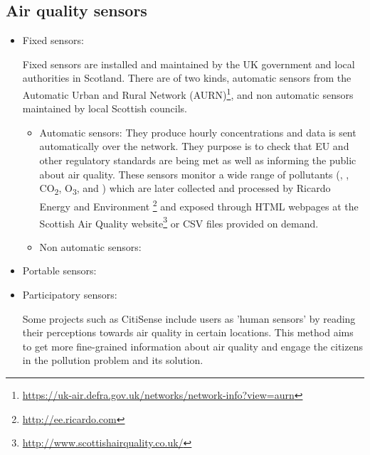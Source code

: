 \subsection{Air quality sensors}

\begin{itemize}

\item Fixed sensors: 

Fixed sensors are installed and maintained by the UK government and local authorities in Scotland. There are of two kinds, automatic sensors from the Automatic Urban and Rural Network (AURN)\footnote{\url{https://uk-air.defra.gov.uk/networks/network-info?view=aurn}}, and non automatic sensors maintained by local Scottish councils. 

	\begin{itemize}
    
    \item Automatic sensors: They produce hourly concentrations and data is sent automatically over the network. They purpose is to check that EU and other regulatory standards are being met as well as informing the public about air quality. These sensors monitor a wide range of pollutants (\NOX, \SOTWO, CO\textsubscript{2}, O\textsubscript{3}, \PMTWO and \PMTEN) which are later collected and processed by Ricardo Energy and Environment \footnote{\url{http://ee.ricardo.com}} and exposed through HTML webpages at the Scottish Air Quality website\footnote{\url{http://www.scottishairquality.co.uk/}} or CSV files provided on demand. 
	\item Non automatic sensors: 
    
    \end{itemize}

\item Portable sensors:

\item Participatory sensors:

Some projects such as CitiSense \cite{Nikzad2012} include users as 'human sensors' by reading their perceptions towards air quality in certain locations. This method aims to get more fine-grained information about air quality and engage the citizens in the pollution problem and its solution. 

\end{itemize}




